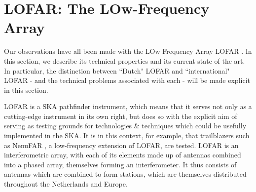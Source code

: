 \section{LOFAR: The LOw-Frequency Array}

\pg
Our observations have all been made with the LOw Frequency Array LOFAR . In this section, we describe its technical properties and its current state of the art. In particular, the distinction between ``Dutch" LOFAR and ``international" LOFAR - and the technical problems associated with each - will be made explicit in this section.

\pg
LOFAR is a SKA pathfinder instrument, which means that it serves not only as a cutting-edge instrument in its own right, but does so with the explicit aim of serving as testing grounds for technologies \& techniques which could be usefully implemented in the SKA. It is in this context, for example, that trailblazers such as NenuFAR , a low-frequency extension of LOFAR, are tested. LOFAR is an interferometric array, with each of its elements made up of antennas combined into a phased array, themselves forming an interferometer. It thus consists of antennas which are combined to form stations, which are themselves distributed throughout the Netherlands and Europe.
